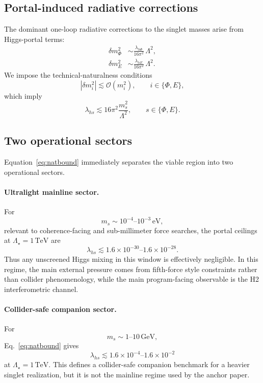 \documentclass[aps,prd,twocolumn,superscriptaddress,nofootinbib]{revtex4-2}
\begin{document}
\subsection{Portal-induced radiative corrections}
The dominant one-loop radiative corrections to the singlet masses arise from Higgs-portal terms:
\begin{align}
\delta m_{\Phi}^2 &\sim \frac{\lambda_{h\Phi}}{16\pi^2}\,\Lambda^2,\\
\delta m_E^2 &\sim \frac{\lambda_{hE}}{16\pi^2}\,\Lambda^2.
\end{align}
We impose the technical-naturalness conditions
\begin{equation}
|\delta m_i^2|\lesssim \mathcal{O}(m_i^2),\qquad i\in\{\Phi,E\},
\end{equation}
which imply
\begin{equation}
\lambda_{hs}\lesssim 16\pi^2\frac{m_s^2}{\Lambda^2},\qquad s\in\{\Phi,E\}.
\label{eq:natbound}
\end{equation}

\subsection{Two operational sectors}
Equation~\eqref{eq:natbound} immediately separates the viable region into two operational sectors.

\paragraph*{Ultralight mainline sector.}
For
\begin{equation}
m_s\sim 10^{-4}\text{--}10^{-3}\,\mathrm{eV},
\end{equation}
relevant to coherence-facing and sub-millimeter force searches, the portal ceilings at $\Lambda_{\star}=1\,\mathrm{TeV}$ are
\begin{equation}
\lambda_{hs}\lesssim 1.6\times10^{-30}\text{--}1.6\times10^{-28}.
\end{equation}
Thus any unscreened Higgs mixing in this window is effectively negligible. In this regime, the main external pressure comes from fifth-force style constraints rather than collider phenomenology, while the main program-facing observable is the H2 interferometric channel.

\paragraph*{Collider-safe companion sector.}
For
\begin{equation}
m_s\sim 1\text{--}10\,\mathrm{GeV},
\end{equation}
Eq.~\eqref{eq:natbound} gives
\begin{equation}
\lambda_{hs}\lesssim 1.6\times10^{-4}\text{--}1.6\times10^{-2}
\end{equation}
at $\Lambda_{\star}=1\,\mathrm{TeV}$. This defines a collider-safe companion benchmark for a heavier singlet realization, but it is not the mainline regime used by the anchor paper.
\end{document}
